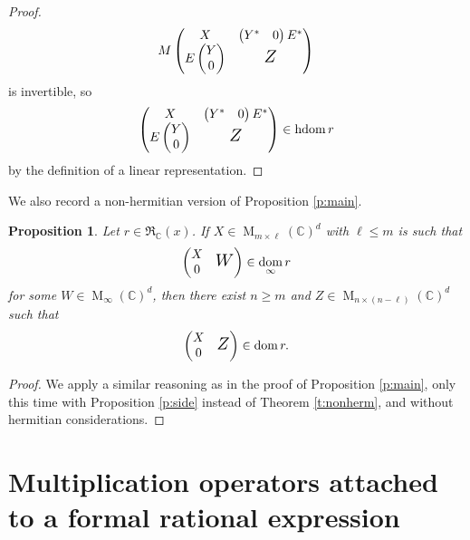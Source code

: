 \documentclass[12pt,a4paper]{amsart}
\DeclareMathOperator{\dom}{dom}
\DeclareMathOperator{\hdom}{hdom}
\DeclareMathOperator{\opm}{M}
\newcommand{\C}{\mathbb{C}}
\newcommand*{\mathlarger}[1]{\scalebox{1.35}{$#1$}}
\newcommand*{\mat}[1]{\opm_{#1}(\C)}
\newcommand{\cfm}{\opm_\infty(\C)}
\newcommand{\rex}{\mathfrak{R}_{\C}(x)}
\newtheorem{prop}[thm]{Proposition}
\theoremstyle{definition}
\theoremstyle{remark}
\numberwithin{equation}{section}
\begin{document}
\begin{proof}
$$M\begin{pmatrix}
X & \begin{pmatrix} Y^* & 0\end{pmatrix}E^* \\
E\begin{pmatrix} Y \\ 0\end{pmatrix} & \mathlarger{Z}
\end{pmatrix}
$$
is invertible, so
$$
\begin{pmatrix}
X & \begin{pmatrix} Y^* & 0\end{pmatrix}E^* \\
E\begin{pmatrix} Y \\ 0\end{pmatrix} & \mathlarger{Z}
\end{pmatrix}  \in\hdom r 
$$
by the definition of a linear representation.
\end{proof}

We also record a non-hermitian version of Proposition \ref{p:main}.

\begin{prop}\label{p:main2}
Let $r\in\rex$. If $X\in\mat{m\times \ell}^d$ with $\ell\le m$ is such that
$$\begin{pmatrix}
\begin{matrix} X\\ 0\end{matrix} & \mathlarger{W}
\end{pmatrix} 
\in \dom_\infty r
$$
for some $W\in\cfm^d$, then there exist $n\ge m$ and $Z\in\mat{n\times (n-\ell)}^d$ such that
$$\begin{pmatrix}
\begin{matrix} X \\ 0\end{matrix} & \mathlarger{Z}
\end{pmatrix} \in \dom r.
$$
\end{prop}

\begin{proof}
We apply a similar reasoning as in the proof of Proposition \ref{p:main}, only this time with Proposition \ref{p:side} instead of Theorem \ref{t:nonherm}, and without hermitian considerations.
\end{proof}

\section{Multiplication operators attached to a formal rational expression}\label{s4}
\end{document}
